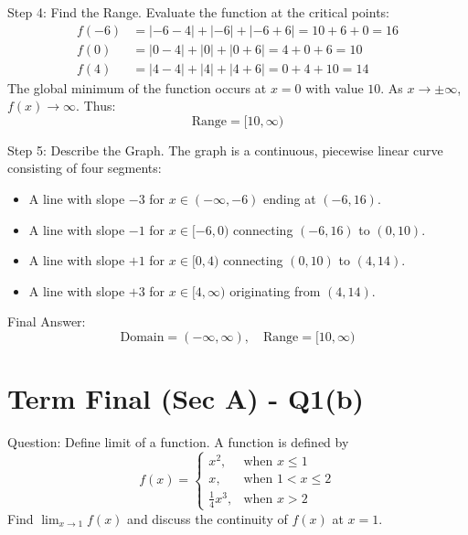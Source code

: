 \documentclass{article}
\begin{document}
Step 4: Find the Range.
Evaluate the function at the critical points:
\begin{align*}
    f(-6) &= |-6-4| + |-6| + |-6+6| = 10 + 6 + 0 = 16 \\
    f(0) &= |0-4| + |0| + |0+6| = 4 + 0 + 6 = 10 \\
    f(4) &= |4-4| + |4| + |4+6| = 0 + 4 + 10 = 14
\end{align*}
The global minimum of the function occurs at $x = 0$ with value $10$. As $x \to \pm\infty$, $f(x) \to \infty$. Thus:
\[
\text{Range} = [10, \infty)
\]

Step 5: Describe the Graph.
The graph is a continuous, piecewise linear curve consisting of four segments:
\begin{itemize}
    \item A line with slope $-3$ for $x \in (-\infty, -6)$ ending at $(-6, 16)$.
    \item A line with slope $-1$ for $x \in [-6, 0)$ connecting $(-6, 16)$ to $(0, 10)$.
    \item A line with slope $+1$ for $x \in [0, 4)$ connecting $(0, 10)$ to $(4, 14)$.
    \item A line with slope $+3$ for $x \in [4, \infty)$ originating from $(4, 14)$.
\end{itemize}

Final Answer:
\[
\boxed{\text{Domain} = (-\infty, \infty), \quad \text{Range} = [10, \infty)}
\]

\section*{Term Final (Sec A) - Q1(b)}
Question:
Define limit of a function. A function is defined by
\[
f(x) = \begin{cases} 
x^2, & \text{when } x \le 1 \\ 
x, & \text{when } 1 < x \le 2 \\ 
\frac{1}{4}x^3, & \text{when } x > 2 
\end{cases}
\]
Find $\lim_{x \to 1} f(x)$ and discuss the continuity of $f(x)$ at $x = 1$.
\end{document}
